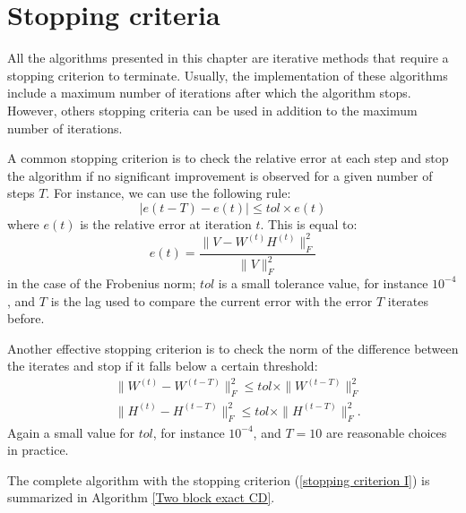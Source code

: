 \section{Stopping criteria} \label{Stopping criteria section}
All the algorithms presented in this chapter are iterative methods that require a stopping criterion to terminate.
Usually, the implementation of these algorithms include a maximum number of iterations after which the algorithm stops.
However, others stopping criteria can be used in addition to the maximum number of iterations.
\par
A common stopping criterion is to check the relative error at each step and stop the algorithm if no significant improvement is observed for a given number of steps $T$.
For instance, we can use the following rule:
\begin{equation} \label{stopping criterion I}
    |e(t - T) - e(t)| \leq tol\times e(t)
\end{equation}
where $e(t)$ is the relative error at iteration $t$. This is equal to:
\begin{equation}  
    e(t) = \frac{\|V - W^{(t)}H^{(t)}\|_F^2}{\|V\|_F^2}
\end{equation}
in the case of the Frobenius norm; 
$tol$ is a small tolerance value,  for instance $10^{-4}$, and $T$ is the lag used to compare the current error with the error $T$ iterates before.
\par
Another effective stopping criterion is to check the norm of the difference between the iterates and stop if it falls below a certain threshold:
\begin{align}
    &\|W^{(t)} - W^{(t-T)}\|_F^2 \leq tol \times \|W^{(t - T)}\|_F^2 \\
    &\|H^{(t)} - H^{(t-T)}\|_F^2 \leq tol \times \|H^{(t - T)}\|_F^2.
\end{align}
Again a small value for $tol$, for instance $10^{-4}$, and $T = 10$ are reasonable choices in practice.
\par
The complete algorithm with the stopping criterion (\ref{stopping criterion I}) is summarized in Algorithm \ref{Two block exact CD}.
